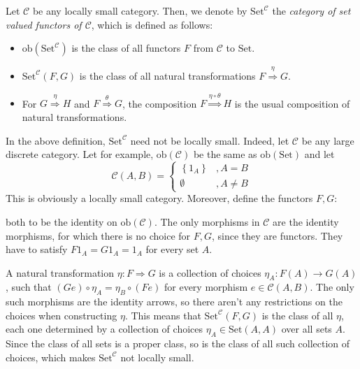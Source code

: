 \begin{definition} Let $\mathcal{C}$ be any locally small category. Then, we denote by $\mathrm{Set}^{\mathcal{C}}$ the \emph{category of set valued functors of $\mathcal{C}$}, which is defined as follows:
\begin{itemize}
\item $\mathrm{ob}\left(\mathrm{Set}^{\mathcal{C}}\right)$ is the class of all functors $F$ from $\mathcal{C}$ to $\mathrm{Set}$.
\item $\mathrm{Set}^{\mathcal{C}}(F,G)$ is the class of all natural transformations $F\overset{\eta}{\Rightarrow}G$.
\item For $G\overset{\eta}{\Rightarrow}H$ and $F\overset{\theta}{\Rightarrow}G$, the composition $F\overset{\eta\circ\theta}{\Rightarrow}H$ is the usual composition of natural transformations.
\end{itemize}
\end{definition}
\begin{remark} In the above definition, $\mathrm{Set}^{\mathcal{C}}$ need not be locally small. Indeed, let $\mathcal{C}$ be any large discrete category. Let for example, $\mathrm{ob}(\mathcal{C})$ be the same as $\mathrm{ob}(\mathrm{Set})$ and let
\[\mathcal{C}(A,B)=\left\{\begin{array}{ll}\left\{1_A\right\}&,A=B\\\emptyset&,A\neq B\end{array}\right.\]
This is obviously a locally small category. Moreover, define the functors $F,G$:
\begin{center}
\end{center}
both to be the identity on $\mathrm{ob}(\mathcal{C})$. The only morphisms in $\mathcal{C}$ are the identity morphisms, for which there is no choice for $F,G$, since they are functors. They have to satisfy $F1_A=G1_A=1_A$ for every set $A$.

A natural transformation $\eta:F\Rightarrow G$ is a collection of choices $\eta_A:F(A)\to G(A)$, such that $(Ge)\circ\eta_A=\eta_B\circ(Fe)$ for every morphism $e\in\mathcal{C}(A,B)$. The only such morphisms are the identity arrows, so there aren't any restrictions on the choices when constructing $\eta$. This means that $\mathrm{Set}^{\mathcal{C}}(F,G)$ is the class of all $\eta$, each one determined by a collection of choices $\eta_A\in\mathrm{Set}(A,A)$ over all sets $A$. Since the class of all sets is a proper class, so is the class of all such collection of choices, which makes $\mathrm{Set}^{\mathcal{C}}$ not locally small.
\end{remark}

